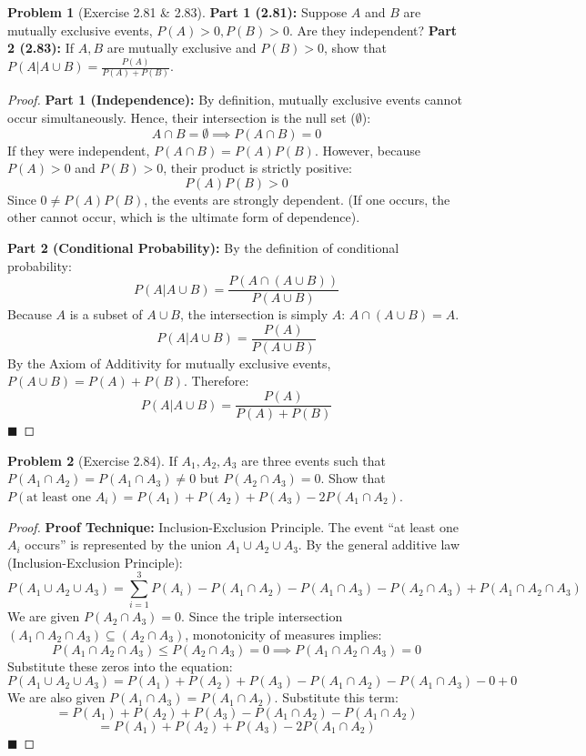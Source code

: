 \documentclass[11pt, letterpaper]{article}
\theoremstyle{definition}
\newtheorem{problem}{Problem}
\begin{document}
\begin{problem}[Exercise 2.81 \& 2.83]
\textbf{Part 1 (2.81):} Suppose $A$ and $B$ are mutually exclusive events, $P(A)>0, P(B)>0$. Are they independent?
\textbf{Part 2 (2.83):} If $A, B$ are mutually exclusive and $P(B)>0$, show that $P(A | A \cup B) = \frac{P(A)}{P(A) + P(B)}$.
\end{problem}
\begin{proof}
\textbf{Part 1 (Independence):}
By definition, mutually exclusive events cannot occur simultaneously. Hence, their intersection is the null set ($\emptyset$):
\[ A \cap B = \emptyset \implies P(A \cap B) = 0 \]
If they were independent, $P(A \cap B) = P(A)P(B)$. However, because $P(A)>0$ and $P(B)>0$, their product is strictly positive:
\[ P(A)P(B) > 0 \]
Since $0 \neq P(A)P(B)$, the events are strongly dependent. (If one occurs, the other cannot occur, which is the ultimate form of dependence). 

\textbf{Part 2 (Conditional Probability):}
By the definition of conditional probability:
\[ P(A | A \cup B) = \frac{P(A \cap (A \cup B))}{P(A \cup B)} \]
Because $A$ is a subset of $A \cup B$, the intersection is simply $A$: $A \cap (A \cup B) = A$.
\[ P(A | A \cup B) = \frac{P(A)}{P(A \cup B)} \]
By the Axiom of Additivity for mutually exclusive events, $P(A \cup B) = P(A) + P(B)$. Therefore:
\[ P(A | A \cup B) = \frac{P(A)}{P(A) + P(B)} \]
$\blacksquare$
\end{proof}

\vspace{0.5cm}

\begin{problem}[Exercise 2.84]
If $A_1, A_2, A_3$ are three events such that $P(A_1 \cap A_2) = P(A_1 \cap A_3) \neq 0$ but $P(A_2 \cap A_3) = 0$. Show that $P(\text{at least one } A_i) = P(A_1) + P(A_2) + P(A_3) - 2P(A_1 \cap A_2)$.
\end{problem}
\begin{proof}
\textbf{Proof Technique:} Inclusion-Exclusion Principle.
The event ``at least one $A_i$ occurs'' is represented by the union $A_1 \cup A_2 \cup A_3$. By the general additive law (Inclusion-Exclusion Principle):
\[ P(A_1 \cup A_2 \cup A_3) = \sum_{i=1}^3 P(A_i) - P(A_1 \cap A_2) - P(A_1 \cap A_3) - P(A_2 \cap A_3) + P(A_1 \cap A_2 \cap A_3) \]
We are given $P(A_2 \cap A_3) = 0$. Since the triple intersection $(A_1 \cap A_2 \cap A_3) \subseteq (A_2 \cap A_3)$, monotonicity of measures implies:
\[ P(A_1 \cap A_2 \cap A_3) \leq P(A_2 \cap A_3) = 0 \implies P(A_1 \cap A_2 \cap A_3) = 0 \]
Substitute these zeros into the equation:
\[ P(A_1 \cup A_2 \cup A_3) = P(A_1) + P(A_2) + P(A_3) - P(A_1 \cap A_2) - P(A_1 \cap A_3) - 0 + 0 \]
We are also given $P(A_1 \cap A_3) = P(A_1 \cap A_2)$. Substitute this term:
\[ = P(A_1) + P(A_2) + P(A_3) - P(A_1 \cap A_2) - P(A_1 \cap A_2) \]
\[ = P(A_1) + P(A_2) + P(A_3) - 2P(A_1 \cap A_2) \]
$\blacksquare$
\end{proof}
\end{document}
